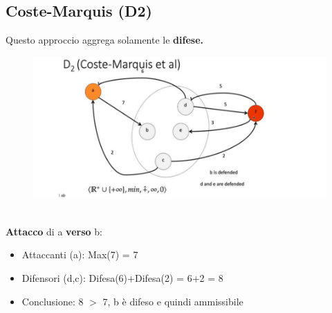 \subsection{Coste-Marquis (D2)}
Questo approccio aggrega solamente le \textbf{difese.}
\begin{figure}[htp]
	\centering
    \includegraphics[width=12cm, keepaspectratio]{img/Cap6/marquis.png}
\end{figure}
\\\textbf{Attacco} di a \textbf{verso} b:
\begin{itemize}
    \item Attaccanti (a): Max(7) = 7
    \item Difensori (d,c): Difesa(6)+Difesa(2) = 6+2 = 8
    \item Conclusione: 8 $>$ 7, b è difeso e quindi ammissibile
\end{itemize}
\newpage
